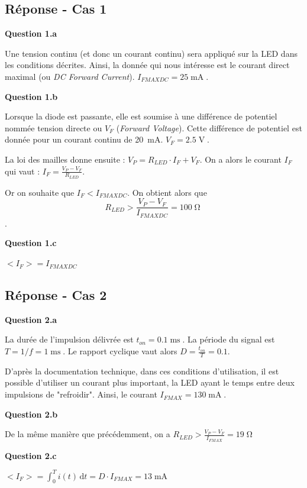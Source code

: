\subsection*{Réponse - Cas 1}

\textbf{Question 1.a}

Une tension continu (et donc un courant continu) sera appliqué sur la LED dans les conditions décrites. Ainsi, la donnée qui nous intéresse est le courant direct maximal (ou \textit{DC Forward Current}). $I_{FMAXDC} = 25\operatorname{mA}$.



\textbf{Question 1.b}
	
Lorsque la diode est passante, elle est soumise à une différence de potentiel nommée tension directe ou $V_F$ (\textit{Forward Voltage}). Cette différence de potentiel est donnée pour un courant continu de 20~mA. $V_F = 2.5\operatorname{V}$.

La loi des mailles donne ensuite : $V_P = R_{LED} \cdot I_F + V_F$. On a alors le courant $I_F$ qui vaut : $I_F = \frac{V_P - V_F}{R_{LED}}$.

Or on souhaite que $I_F < I_{FMAXDC}$. On obtient alors que $$R_{LED} > \frac{V_P - V_F}{I_{FMAXDC}} = 100\operatorname{\Omega}$$.


\textbf{Question 1.c}

$<I_F> = I_{FMAXDC}$

\subsection*{Réponse - Cas 2}

\textbf{Question 2.a}
	
La durée de l'impulsion délivrée est $t_{on} = 0.1\operatorname{ms}$. La période du signal est $T = 1/f = 1\operatorname{ms}$. Le rapport cyclique vaut alors $D = \frac{t_{on}}{T} = 0.1$.

D'après la documentation technique, dans ces conditions d'utilisation, il est possible d'utiliser un courant plus important, la LED ayant le temps entre deux impulsions de "refroidir". Ainsi, le courant $I_{FMAX} = 130\operatorname{mA}$.


\textbf{Question 2.b}
	
De la même manière que précédemment, on a $R_{LED} > \frac{V_P - V_F}{I_{FMAX}} = 19\operatorname{\Omega}$

\textbf{Question 2.c}

$\displaystyle <I_F> = \int_{0}^{T} i(t) \, \mathrm{d}t = D \cdot I_{FMAX} = 13\operatorname{mA}$



